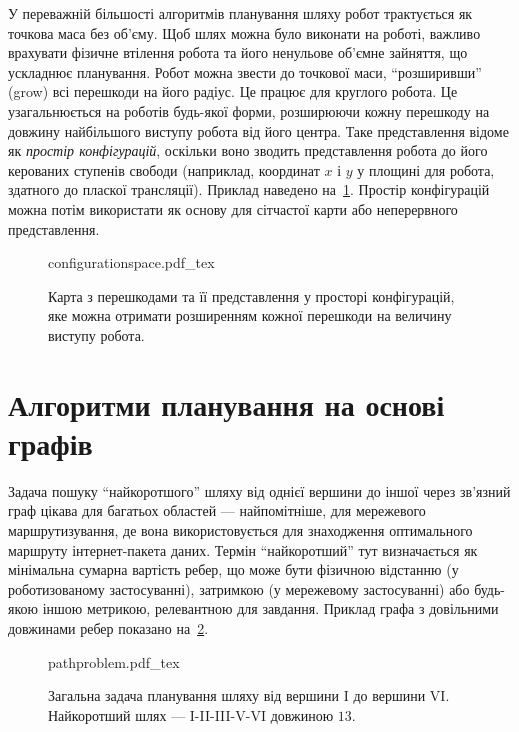 У переважній більшості алгоритмів планування шляху робот трактується як точкова маса без об'єму. Щоб шлях можна було виконати на роботі, важливо врахувати фізичне втілення робота та його ненульове об'ємне зайняття, що ускладнює планування.
Робот можна звести до точкової маси, ``розширивши'' (grow) всі перешкоди на його радіус. Це працює для круглого робота. Це узагальнюється на роботів будь-якої форми, розширюючи кожну перешкоду на довжину найбільшого виступу робота від його центра. Таке представлення відоме як \emph{простір конфігурацій}, оскільки воно зводить представлення робота до його керованих ступенів свободи (наприклад, координат $x$ і $y$ у площині для робота, здатного до пласкої трансляції). Приклад наведено на~\cref{fig:cspace}. Простір конфігурацій можна потім використати як основу для сітчастої карти або неперервного представлення.

\begin{figure}
    \centering
    \def\svgwidth{0.9\textwidth}
    {configurationspace.pdf_tex}
    \caption{Карта з перешкодами та її представлення у просторі конфігурацій, яке можна отримати розширенням кожної перешкоди на величину виступу робота. \label{fig:cspace}}
\end{figure}


\section{Алгоритми планування на основі графів}\label{chap:pathplanning:graph-based}

Задача пошуку ``найкоротшого'' шляху від однієї вершини до іншої через зв'язний граф цікава для багатьох областей — найпомітніше, для мережевого маршрутизування, де вона використовується для знаходження оптимального маршруту інтернет-пакета даних.
Термін ``найкоротший'' тут визначається як мінімальна сумарна вартість ребер, що може бути фізичною відстанню (у роботизованому застосуванні), затримкою (у мережевому застосуванні) або будь-якою іншою метрикою, релевантною для завдання. Приклад графа з довільними довжинами ребер показано на~\cref{fig:pathproblem}.

\begin{figure}
    \centering
    \def\svgwidth{0.6\textwidth}
    {pathproblem.pdf_tex}
    \caption{Загальна задача планування шляху від вершини I до вершини VI. Найкоротший шлях — I-II-III-V-VI довжиною $13$. \label{fig:pathproblem}}
\end{figure}

